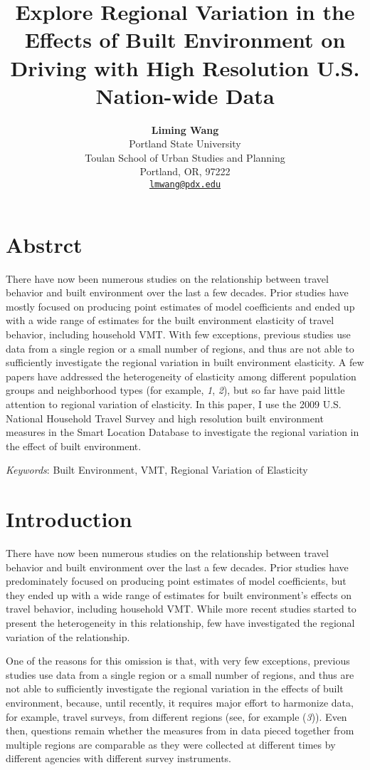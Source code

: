\documentclass[numbered]{trbunofficial}
\title{Explore Regional Variation in the Effects of Built Environment on Driving with High Resolution U.S. Nation-wide Data}
\author{
      \textbf{Liming Wang} \\
    {Portland State University} \\
    {Toulan School of Urban Studies and Planning} \\  {Portland, OR, 97222} \\  
    {\href{mailto:lmwang@pdx.edu}{\nolinkurl{lmwang@pdx.edu}}} \\
    \hfill\break%
  }
\begin{document}
\nolinenumbers
\maketitle

\linenumbers

\section{Abstrct}
There have now been numerous studies on the relationship between travel behavior and built environment over the last a few decades. Prior studies have mostly focused on producing point estimates of model coefficients and ended up with a wide range of estimates for the built environment elasticity of travel behavior, including household VMT. With few exceptions, previous studies use data from a single region or a small number of regions, and thus are not able to sufficiently investigate the regional variation in built environment elasticity. A few papers have addressed the heterogeneity of elasticity among different population groups and neighborhood types (for example, \emph{1}, \emph{2}), but so far have paid little attention to regional variation of elasticity. In this paper, I use the 2009 U.S. National Household Travel Survey and high resolution built environment measures in the Smart Location Database to investigate the regional variation in the effect of built environment.
\hfill\break

  \noindent\textit{Keywords}: Built Environment, VMT, Regional Variation of Elasticity

\newpage

\hypertarget{introduction}{%
\section{Introduction}\label{introduction}}

There have now been numerous studies on the relationship between travel behavior and built environment over the last a few decades. Prior studies have predominately focused on producing point estimates of model coefficients, but they ended up with a wide range of estimates for built environment's effects on travel behavior, including household VMT. While more recent studies started to present the heterogeneity in this relationship, few have investigated the regional variation of the relationship.

One of the reasons for this omission is that, with very few exceptions, previous studies use data from a single region or a small number of regions, and thus are not able to sufficiently investigate the regional variation in the effects of built environment, because, until recently, it requires major effort to harmonize data, for example, travel surveys, from different regions (see, for example (\emph{3})). Even then, questions remain whether the measures from in data pieced together from multiple regions are comparable as they were collected at different times by different agencies with different survey instruments.
\end{document}

